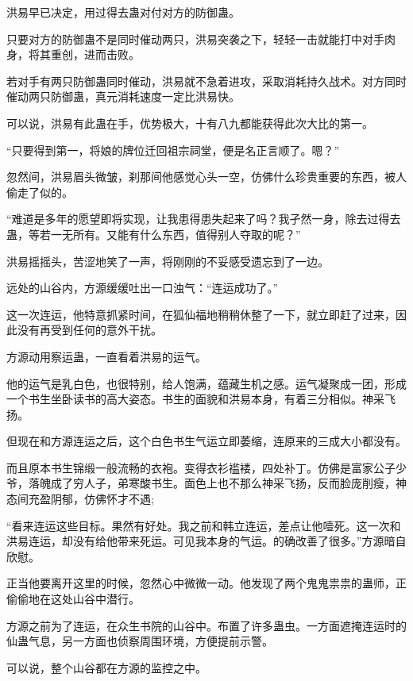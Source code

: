 
\begin{this_body}



洪易早已决定，用过得去蛊对付对方的防御蛊。

只要对方的防御蛊不是同时催动两只，洪易突袭之下，轻轻一击就能打中对手肉身，将其重创，进而击败。

若对手有两只防御蛊同时催动，洪易就不急着进攻，采取消耗持久战术。对方同时催动两只防御蛊，真元消耗速度一定比洪易快。

可以说，洪易有此蛊在手，优势极大，十有八九都能获得此次大比的第一。

“只要得到第一，将娘的牌位迁回祖宗祠堂，便是名正言顺了。嗯？”

忽然间，洪易眉头微皱，刹那间他感觉心头一空，仿佛什么珍贵重要的东西，被人偷走了似的。

“难道是多年的愿望即将实现，让我患得患失起来了吗？我孑然一身，除去过得去蛊，等若一无所有。又能有什么东西，值得别人夺取的呢？”

洪易摇摇头，苦涩地笑了一声，将刚刚的不妥感受遗忘到了一边。

远处的山谷内，方源缓缓吐出一口浊气：“连运成功了。”

这一次连运，他特意抓紧时间，在狐仙福地稍稍休整了一下，就立即赶了过来，因此没有再受到任何的意外干扰。

方源动用察运蛊，一直看着洪易的运气。

他的运气是乳白色，也很特别，给人饱满，蕴藏生机之感。运气凝聚成一团，形成一个书生坐卧读书的高大姿态。书生的面貌和洪易本身，有着三分相似。神采飞扬。

但现在和方源连运之后，这个白色书生气运立即萎缩，连原来的三成大小都没有。

而且原本书生锦缎一般流畅的衣袍。变得衣衫褴褛，四处补丁。仿佛是富家公子少爷，落魄成了穷人子，弟寒酸书生。面色上也不那么神采飞扬，反而脸庞削瘦，神态间充盈阴郁，仿佛怀才不遇;

“看来连运这些目标。果然有好处。我之前和韩立连运，差点让他噎死。这一次和洪易连运，却没有给他带来死运。可见我本身的气运。的确改善了很多。”方源暗自欣慰。

正当他要离开这里的时候，忽然心中微微一动。他发现了两个鬼鬼祟祟的蛊师，正偷偷地在这处山谷中潜行。

方源之前为了连运，在众生书院的山谷中。布置了许多蛊虫。一方面遮掩连运时的仙蛊气息，另一方面也侦察周围环境，方便提前示警。

可以说，整个山谷都在方源的监控之中。


\end{this_body}
